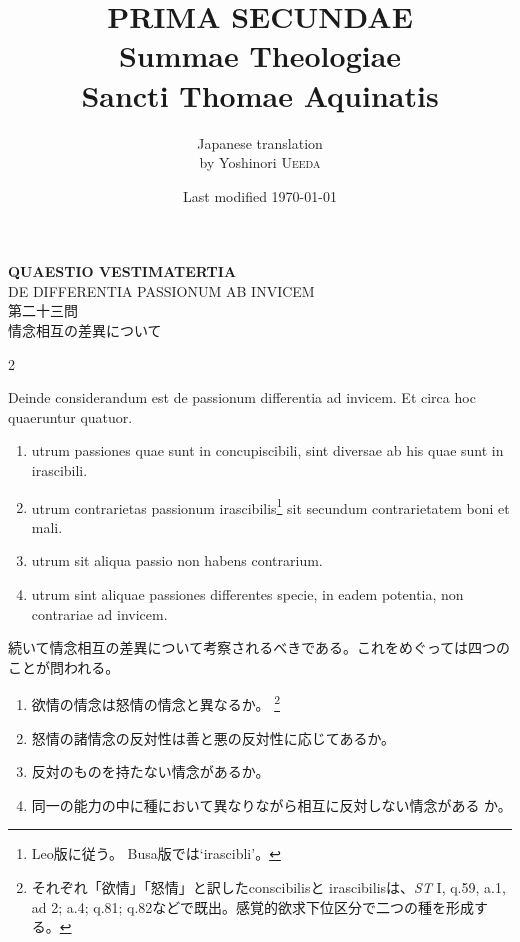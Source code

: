 \documentclass[paper=a4paper,fontsize=10pt,jafontsize=9pt,titlepage]{jlreq}
\title{{\bfseries PRIMA SECUNDAE}\\{\Huge Summae Theologiae}\\Sancti Thomae
Aquinatis}
\author{Japanese translation\\by Yoshinori {\scshape Ueeda}}
\date{Last modified \today}
\begin{document}
\maketitle
\pagestyle{fancy}


\begin{center}
 {\Large {\bfseries QUAESTIO VESTIMATERTIA}}\\
 {\large DE DIFFERENTIA PASSIONUM AB INVICEM}\\

 {\Large 第二十三問\\情念相互の差異について}
\end{center}

\begin{paracol}{2}

Deinde considerandum est de passionum differentia ad invicem. Et circa
 hoc quaeruntur quatuor.

\begin{enumerate}
 \item utrum passiones quae sunt in concupiscibili, sint diversae ab his quae sunt in irascibili.
 \item utrum contrarietas passionum irascibilis\footnote{Leo版に従う。
       Busa版では`irascibli'。} sit secundum contrarietatem boni et mali.
 \item utrum sit aliqua passio non habens contrarium.
 \item utrum sint aliquae passiones differentes specie, in eadem potentia, non contrariae ad invicem.
\end{enumerate}

\switchcolumn

続いて情念相互の差異について考察されるべきである。これをめぐっては四つの
 ことが問われる。

 \begin{enumerate}
  \item 欲情の情念は怒情の情念と異なるか。
	\footnote{それぞれ「欲情」「怒情」と訳したconscibilisと
	irascibilisは、{\itshape ST} I, q.59, a.1, ad 2; a.4; q.81;
	q.82などで既出。感覚的欲求下位区分で二つの種を形成する。}
  \item 怒情の諸情念の反対性は善と悪の反対性に応じてあるか。
  \item 反対のものを持たない情念があるか。
  \item 同一の能力の中に種において異なりながら相互に反対しない情念がある
	か。
 \end{enumerate}

\end{paracol}
\end{document}
